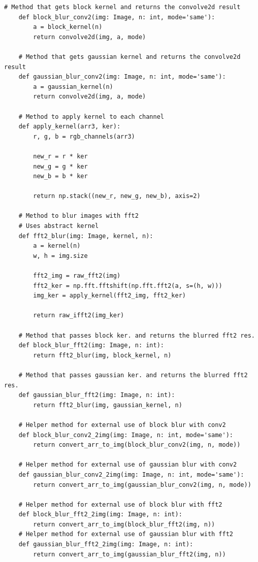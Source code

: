 \documentclass[a4paper, 12pt]{article}
\begin{document}
\begin{lstlisting}[label=task2, caption={Программные методы, необходимые для задания 2}]
    # Method that gets block kernel and returns the convolve2d result
    def block_blur_conv2(img: Image, n: int, mode='same'):
        a = block_kernel(n)
        return convolve2d(img, a, mode)

    # Method that gets gaussian kernel and returns the convolve2d result
    def gaussian_blur_conv2(img: Image, n: int, mode='same'):
        a = gaussian_kernel(n)
        return convolve2d(img, a, mode)

    # Method to apply kernel to each channel
    def apply_kernel(arr3, ker):
        r, g, b = rgb_channels(arr3)

        new_r = r * ker
        new_g = g * ker
        new_b = b * ker

        return np.stack((new_r, new_g, new_b), axis=2)

    # Method to blur images with fft2
    # Uses abstract kernel
    def fft2_blur(img: Image, kernel, n):
        a = kernel(n)
        w, h = img.size

        fft2_img = raw_fft2(img)
        fft2_ker = np.fft.fftshift(np.fft.fft2(a, s=(h, w)))
        img_ker = apply_kernel(fft2_img, fft2_ker)

        return raw_ifft2(img_ker)

    # Method that passes block ker. and returns the blurred fft2 res.
    def block_blur_fft2(img: Image, n: int):
        return fft2_blur(img, block_kernel, n)

    # Method that passes gaussian ker. and returns the blurred fft2 res.
    def gaussian_blur_fft2(img: Image, n: int):
        return fft2_blur(img, gaussian_kernel, n)

    # Helper method for external use of block blur with conv2
    def block_blur_conv2_2img(img: Image, n: int, mode='same'):
        return convert_arr_to_img(block_blur_conv2(img, n, mode))
    
    # Helper method for external use of gaussian blur with conv2
    def gaussian_blur_conv2_2img(img: Image, n: int, mode='same'):
        return convert_arr_to_img(gaussian_blur_conv2(img, n, mode))
    
    # Helper method for external use of block blur with fft2
    def block_blur_fft2_2img(img: Image, n: int):
        return convert_arr_to_img(block_blur_fft2(img, n))
    # Helper method for external use of gaussian blur with fft2
    def gaussian_blur_fft2_2img(img: Image, n: int):
        return convert_arr_to_img(gaussian_blur_fft2(img, n))
    \end{lstlisting}
\end{document}
